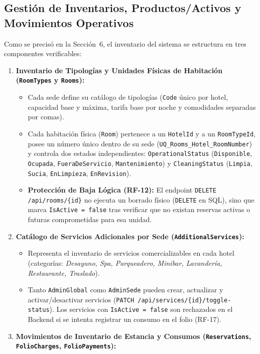 \documentclass[12pt,a4paper]{article}
\begin{document}
\subsection{Gesti\'on de Inventarios, Productos/Activos y Movimientos Operativos}
Como se precis\'o en la Secci\'on~6, el inventario del sistema se estructura en tres componentes verificables:
\begin{enumerate}
    \item \textbf{Inventario de Tipolog\'ias y Unidades F\'isicas de Habitaci\'on (\texttt{RoomTypes} y \texttt{Rooms}):}
    \begin{itemize}
        \item Cada sede define su cat\'alogo de tipolog\'ias (\texttt{Code} \'unico por hotel, capacidad base y m\'axima, tarifa base por noche y comodidades separadas por comas).
        \item Cada habitaci\'on f\'isica (\texttt{Room}) pertenece a un \texttt{HotelId} y a un \texttt{RoomTypeId}, posee un n\'umero \'unico dentro de su sede (\texttt{UQ\_Rooms\_Hotel\_RoomNumber}) y controla dos estados independientes: \texttt{OperationalStatus} (\texttt{Disponible}, \texttt{Ocupada}, \texttt{FueraDeServicio}, \texttt{Mantenimiento}) y \texttt{CleaningStatus} (\texttt{Limpia}, \texttt{Sucia}, \texttt{EnLimpieza}, \texttt{EnRevision}).
        \item \textbf{Protecci\'on de Baja L\'ogica (RF-12):} El endpoint \texttt{DELETE /api/rooms/\{id\}} no ejecuta un borrado f\'isico (\texttt{DELETE} en SQL), sino que marca \texttt{IsActive = false} tras verificar que no existan reservas activas o futuras comprometidas para esa unidad.
    \end{itemize}
    \item \textbf{Cat\'alogo de Servicios Adicionales por Sede (\texttt{AdditionalServices}):}
    \begin{itemize}
        \item Representa el inventario de servicios comercializables en cada hotel (categor\'ias: \textit{Desayuno, Spa, Parqueadero, Minibar, Lavander\'ia, Restaurante, Traslado}).
        \item Tanto \texttt{AdminGlobal} como \texttt{AdminSede} pueden crear, actualizar y activar/desactivar servicios (\texttt{PATCH /api/services/\{id\}/toggle-status}). Los servicios con \texttt{IsActive = false} son rechazados en el Backend si se intenta registrar un consumo en el folio (RF-17).
    \end{itemize}
    \item \textbf{Movimientos de Inventario de Estancia y Consumos (\texttt{Reservations}, \texttt{FolioCharges}, \texttt{FolioPayments}):}

\end{enumerate}
\end{document}
